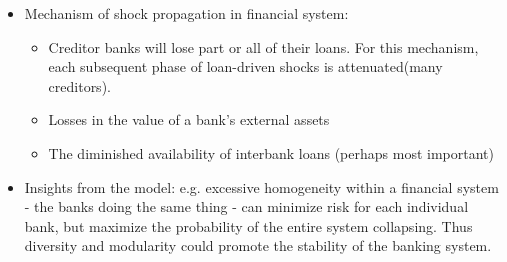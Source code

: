 \documentclass{report}
\begin{document}
\begin{enumerate}
\begin{itemize}
\item Mechanism of shock propagation in financial system: 
\begin{itemize}
\item Creditor banks will lose part or all of their loans. For this mechanism, each subsequent phase of loan-driven shocks is attenuated(many creditors). 
\item Losses in the value of a bank's external assets
\item The diminished availability of interbank loans (perhaps most important)
\end{itemize}

\item Insights from the model: e.g. excessive homogeneity within a financial system - the banks doing the same thing - can minimize risk for each individual bank, but maximize the probability of the entire system collapsing. Thus diversity and modularity could promote the stability of the banking system. 

\end{itemize}

\end{enumerate}
\end{document}
